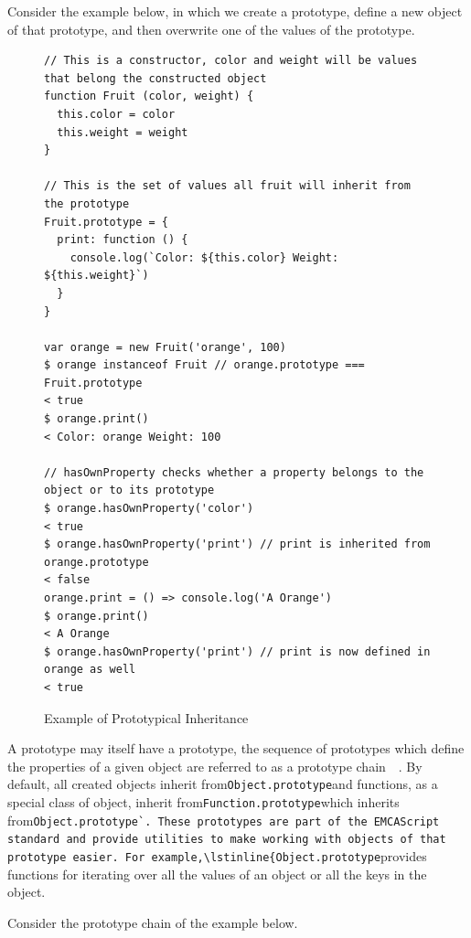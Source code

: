 \documentclass[]{final_report}
\begin{document}
Consider the example below, in which we create a prototype, define a new object of that prototype, and then overwrite one of the values of the prototype.

\begin{figure}[h]
\begin{verbatim}
// This is a constructor, color and weight will be values that belong the constructed object
function Fruit (color, weight) {
  this.color = color
  this.weight = weight
}

// This is the set of values all fruit will inherit from the prototype
Fruit.prototype = {
  print: function () {
    console.log(`Color: ${this.color} Weight: ${this.weight}`)
  }
}

var orange = new Fruit('orange', 100)
$ orange instanceof Fruit // orange.prototype === Fruit.prototype
< true
$ orange.print()
< Color: orange Weight: 100

// hasOwnProperty checks whether a property belongs to the object or to its prototype
$ orange.hasOwnProperty('color') 
< true
$ orange.hasOwnProperty('print') // print is inherited from orange.prototype
< false
orange.print = () => console.log('A Orange')
$ orange.print()
< A Orange
$ orange.hasOwnProperty('print') // print is now defined in orange as well
< true
\end{verbatim}
\caption{\label{fig:js-prototypical-inheritance} Example of Prototypical Inheritance}
\end{figure} 

A prototype may itself have a prototype, the sequence of prototypes which define the properties of a given object are referred to as a prototype chain~\cite{EcmaScript}~\cite{borning1986classes}.  By default, all created objects inherit from\lstinline{Object.prototype}and functions, as a special class of object, inherit from\lstinline{Function.prototype}which inherits from\lstinline{Object.prototype`. These prototypes are part of the EMCAScript standard and provide utilities to make working with objects of that prototype easier. For example,\lstinline{Object.prototype}provides functions for iterating over all the values of an object or all the keys in the object.

Consider the prototype chain of the example below.
\end{document}
